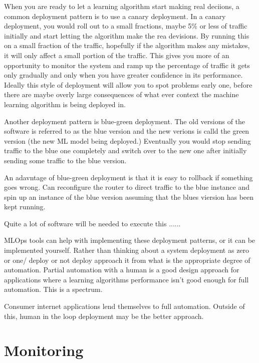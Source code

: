 When you are ready to let a learning algorithm start making real deciions, a common deployment pattern is to use a canary deployment.
In a canary deployment, you would roll out to a small fractions, maybe 5\% or less of traffic initially and start letting the algorithm make the rea devisions.
By running this on a small fraction of the traffic, hopefully if the algorithm makes any mistakes, it will only affect a small portion of the traffic.
This gives you more of an opportunity to monitor the system and ramp up the percentage of traffic it gets only gradually and only when you have greater confidence in its performance.
Ideally this style of deployment will allow you to spot problems early one, before there are maybe overly large consequences of what ever context the machine learning algorithm is being deployed in.



Another deployment pattern is blue-green deployment.
The old versions of the software is referred to as the blue version and the new verions is calld the green version (the new ML model being deployed.)
Eventually you would stop sending traffic to the blue one completely and switch over to the new one after initially sending some traffic to the blue version.

An adavntage of blue-green deployment is that it is easy to rollback if something goes wrong. Can reconfigure the router to direct traffic to the blue instance and spin up an instance of the blue version assuming that the blues viersion has been kept running.

Quite a lot of software will be needed to execute this ......



MLOps tools can help with implementing these deployment patterns, or it can be implemented yourself.
Rather than thinking about a system deployment as zero or one/ deploy or not deploy approach it from what is the appropriate degree of automation.
Partial automation with a human is a good design approach for applications where a learning algorithms performance isn't good enough for full automation.
This is a spectrum.

Consumer internet applications lend themselves to full automation.
Outside of this, human in the loop deployment may be the better approach.

\section{Monitoring}

